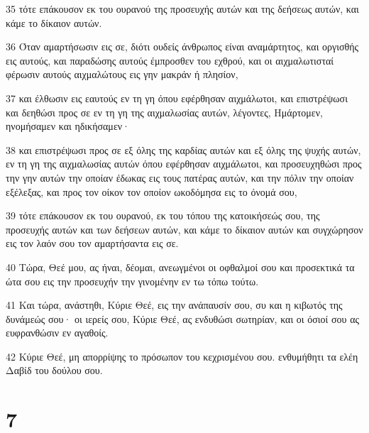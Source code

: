 \par 35 τότε επάκουσον εκ του ουρανού της προσευχής αυτών και της δεήσεως αυτών, και κάμε το δίκαιον αυτών.
\par 36 Όταν αμαρτήσωσιν εις σε, διότι ουδείς άνθρωπος είναι αναμάρτητος, και οργισθής εις αυτούς, και παραδώσης αυτούς έμπροσθεν του εχθρού, και οι αιχμαλωτισταί φέρωσιν αυτούς αιχμαλώτους εις γην μακράν ή πλησίον,
\par 37 και έλθωσιν εις εαυτούς εν τη γη όπου εφέρθησαν αιχμάλωτοι, και επιστρέψωσι και δεηθώσι προς σε εν τη γη της αιχμαλωσίας αυτών, λέγοντες, Ημάρτομεν, ηνομήσαμεν και ηδικήσαμεν·
\par 38 και επιστρέψωσι προς σε εξ όλης της καρδίας αυτών και εξ όλης της ψυχής αυτών, εν τη γη της αιχμαλωσίας αυτών όπου εφέρθησαν αιχμάλωτοι, και προσευχηθώσι προς την γην αυτών την οποίαν έδωκας εις τους πατέρας αυτών, και την πόλιν την οποίαν εξέλεξας, και προς τον οίκον τον οποίον ωκοδόμησα εις το όνομά σου,
\par 39 τότε επάκουσον εκ του ουρανού, εκ του τόπου της κατοικήσεώς σου, της προσευχής αυτών και των δεήσεων αυτών, και κάμε το δίκαιον αυτών και συγχώρησον εις τον λαόν σου τον αμαρτήσαντα εις σε.
\par 40 Τώρα, Θεέ μου, ας ήναι, δέομαι, ανεωγμένοι οι οφθαλμοί σου και προσεκτικά τα ώτα σου εις την προσευχήν την γινομένην εν τω τόπω τούτω.
\par 41 Και τώρα, ανάστηθι, Κύριε Θεέ, εις την ανάπαυσίν σου, συ και η κιβωτός της δυνάμεώς σου· οι ιερείς σου, Κύριε Θεέ, ας ενδυθώσι σωτηρίαν, και οι όσιοί σου ας ευφρανθώσιν εν αγαθοίς.
\par 42 Κύριε Θεέ, μη απορρίψης το πρόσωπον του κεχρισμένου σου. ενθυμήθητι τα ελέη Δαβίδ του δούλου σου.

\chapter{7}

